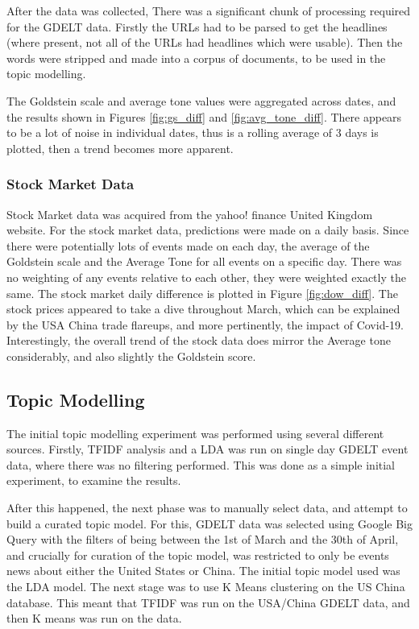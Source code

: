 After the data was collected, There was a significant chunk of processing required for the GDELT data. Firstly the URLs had to be parsed to get the headlines (where present, not all of the URLs had headlines which were usable). Then the words were stripped and made into a corpus of documents, to be used in the topic modelling. 

The Goldstein scale and average tone values were aggregated across dates, and the results shown in Figures \ref{fig:gs_diff} and \ref{fig:avg_tone_diff}. There appears to be a lot of noise in individual dates, thus is a rolling average of 3 days is plotted, then a trend becomes more apparent. 

 
\subsubsection{Stock Market Data}
Stock Market data was acquired from the yahoo! finance United Kingdom website. For the stock market data, predictions were made on a daily basis. Since there were potentially lots of events made on each day, the average of the Goldstein scale and the Average Tone for all events on a specific day. There was no weighting of any events relative to each other, they were weighted exactly the same. The stock market daily difference is plotted in Figure \ref{fig:dow_diff}. The stock prices appeared to take a dive throughout March, which can be explained by the USA China trade flareups, and more pertinently, the impact of Covid-19. Interestingly, the overall trend of the stock data does mirror the Average tone considerably, and also slightly the Goldstein score. 

\subsection{Topic Modelling}

The initial topic modelling experiment was performed using several different sources. Firstly, TFIDF analysis and a LDA was run on single day GDELT event data, where there was no filtering performed. This was done as a simple initial experiment, to examine the results. 

After this happened, the next phase was to manually select data, and attempt to build a curated topic model. For this, GDELT data was selected using Google Big Query with the filters of being between the 1st of March and the 30th of April, and crucially for curation of the topic model, was restricted to only be events news about either the United States or China. The initial topic model used was the LDA model. The next stage was to use K Means clustering on  the US China database. This meant that TFIDF was run on the USA/China GDELT data, and then K means was run on the data.

